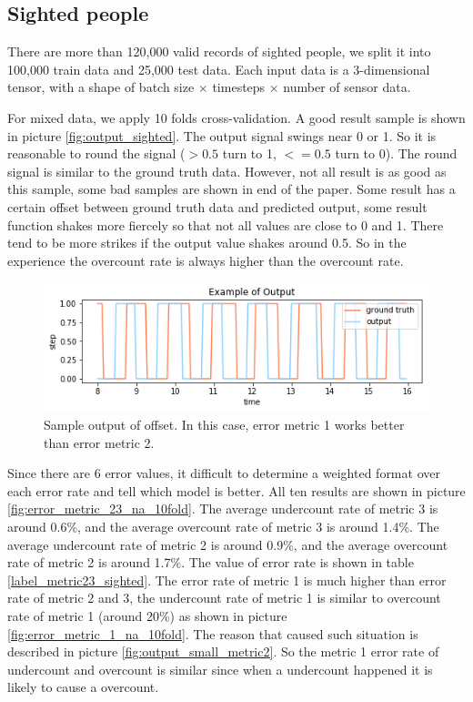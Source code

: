 \documentclass[11pt]{article}
\begin{document}
{\subsection{Sighted people}
There are more than 120,000  valid records of sighted people, we split it into 100,000 train data and 25,000 test data. Each input data is a 3-dimensional tensor, with a shape of batch size $\times$ timesteps $\times$ number of sensor data.

For mixed data, we apply 10 folds cross-validation. A good result sample is shown in picture \ref{fig:output_sighted}. The output signal swings near 0 or 1. So it is reasonable to round the signal ($>0.5$ turn to 1, $<=0.5$ turn to 0). The round signal is similar to the ground truth data. However, not all result is as good as this sample, some bad samples are shown in end of the paper. Some result has a certain offset between ground truth data and predicted output, some result function shakes more fiercely so that not all values are close to 0 and 1. There tend to be more strikes if the output value shakes around 0.5. So in the experience the overcount rate is always higher than the overcount rate.

\begin{figure}[ht]
\centering
\includegraphics[scale=0.4]{output_ex_offset}
\caption{Sample output of offset. In this case, error metric 1 works better than error metric 2.}
\label{fig:output_ex_offset}
\end{figure}


Since there are 6 error values, it difficult to determine a weighted format over each error rate and tell which model is better. All ten results are shown in picture \ref{fig:error_metric_23_na_10fold}.
The average undercount rate of metric 3 is around 0.6\%, and the average overcount rate of metric 3 is around 1.4\%.  
The average undercount rate of metric 2 is around 0.9\%, and the average overcount rate of metric 2 is around 1.7\%.  
The value of error rate is shown in table \ref{label_metric23_sighted}. The error rate of metric 1 is much higher than error rate of metric 2 and 3, the undercount rate of metric 1  is similar to overcount rate of metric 1 (around 20\%) as shown in picture \ref{fig:error_metric_1_na_10fold}. The reason that caused such situation is described in picture \ref{fig:output_small_metric2}. So the metric 1 error rate of undercount and overcount is similar since when a undercount happened it is likely to cause a overcount.

}
\end{document}
